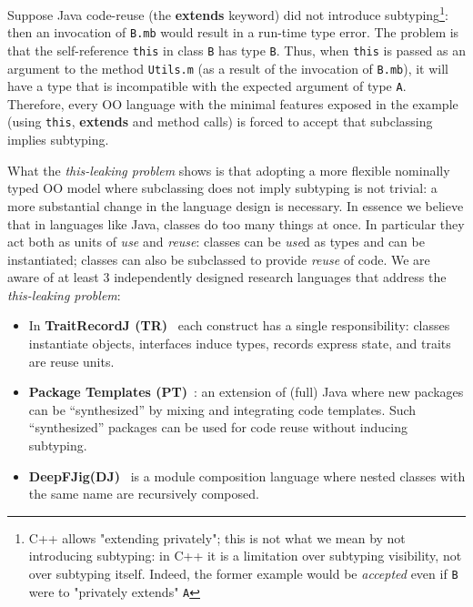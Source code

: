 Suppose Java code-reuse (the {\bf extends} keyword) did not introduce subtyping\footnote{
C++ allows "extending privately"; this is not
what we mean by not introducing subtyping: in C++ it is a limitation over
  subtyping visibility, not over subtyping itself.  Indeed, the
  former example would be \emph{accepted} even if \lstinline{B} were to
  "privately extends" \lstinline{A}}: then an invocation of 
\lstinline{B.mb} would result in a run-time type error.
The problem is that the
self-reference \lstinline{this} in class \lstinline{B} has 
type \lstinline{B}. Thus, when \lstinline{this} is passed as an argument to 
the method \lstinline{Utils.m} (as a result of the invocation of
\lstinline{B.mb}), it will have a type that is incompatible with the
expected argument of type \lstinline{A}.  
Therefore, every OO language with the minimal features exposed in the example (using \lstinline{this},
{\bf extends} and method calls) is forced to accept that subclassing implies
subtyping.
  

What the \emph{this-leaking problem} shows is that adopting a more flexible
nominally typed OO model where subclassing does not imply subtyping is
not trivial: a more substantial change in the language design is
necessary.  In essence we believe that in languages like Java, classes do too many
things at once. In particular they act both as units of \emph{use} and
\emph{reuse}: classes can be \emph{use}d as types and can be instantiated;
classes can also be subclassed to provide \emph{reuse} of code.
We are aware of at least $3$ independently designed research
languages that address the \emph{this-leaking problem}:
\begin{itemize}
\item In {\bf TraitRecordJ (TR)}~\cite{Bettini:2010:ISP:1774088.1774530,BETTINI2013521,Bettini2015282}
each construct has a single responsibility: classes instantiate objects,
interfaces induce types, records express state, and traits are reuse units.
\item {\bf Package Templates (PT)}~\cite{KrogdahlMS09,DBLP:journals/taosd/AxelsenSKM12,DBLP:conf/gpce/AxelsenK12}:
an extension of (full) Java where new packages can be ``synthesized'' by mixing
and integrating code templates. 
Such ``synthesized'' packages can be used for code reuse without inducing subtyping.
\item {\bf
    DeepFJig(DJ)}~\cite{deep,servetto2014meta,fjig} is
a module composition language where nested classes with the same name are recursively composed.
\end{itemize}

